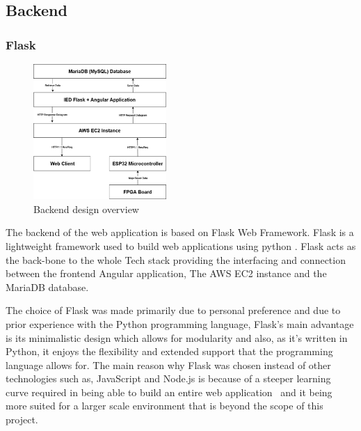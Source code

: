 \subsection{Backend}

\subsubsection*{Flask}
\begin{figure}
    \centerline{\includegraphics[width=0.45\textwidth]{images/backend-flow.png}}
    \caption{Backend design overview}
\end{figure}

The backend of the web application is based on Flask Web Framework. Flask is a lightweight framework used to build web applications using python \cite{ref:whatisflask}. Flask acts as the back-bone to the whole Tech stack providing the interfacing and connection between the frontend Angular application, The AWS EC2 instance and the MariaDB database.  

The choice of Flask was made primarily due to personal preference and due to prior experience with the Python programming language, Flask’s main advantage is its minimalistic design which allows for modularity and also, as it's written in Python, it enjoys the flexibility and extended support that the programming language allows for. The main reason why Flask was chosen instead of other technologies such as, JavaScript and Node.js is because of a steeper learning curve required in being able to build an entire web application~\cite{ref:nodevsflask} and it being more suited for a larger scale environment that is beyond the scope of this project.

